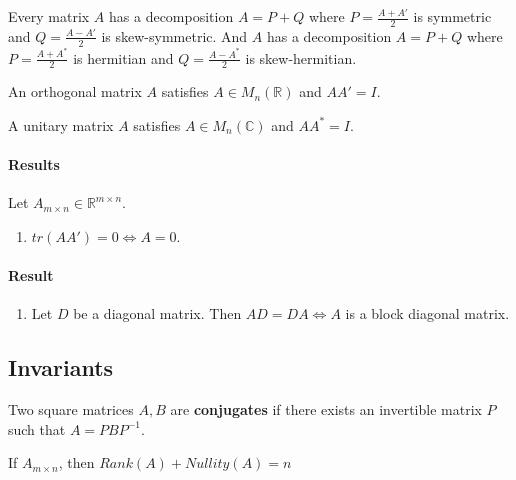 \begin{note}
	Every matrix $A$ has a decomposition $A=P+Q$ where $P = \frac{A+A'}{2}$ is symmetric and $Q = \frac{A-A'}{2}$ is skew-symmetric.
	And $A$ has a decomposition $A = P + Q$ where $P = \frac{A+A^\ast}{2}$ is hermitian and $Q = \frac{A-A^\ast}{2}$ is skew-hermitian.
\end{note}

\begin{definition}[orthogonal]
	An orthogonal matrix $A$ satisfies $A \in M_n(\mathbb{R})$ and $AA' = I$.
\end{definition}

\begin{definition}[unitary]
	A unitary matrix $A$ satisfies $A \in M_n(\mathbb{C})$ and $AA^\ast = I$.
\end{definition}

\paragraph{Results} Let $A_{m \times n} \in \mathbb{R}^{m \times n}$.
\begin{enumerate}
	\item $tr(AA') = 0 \iff A = 0$.
\end{enumerate}

\paragraph{Result}
	\begin{enumerate}
		\item Let $D$ be a diagonal matrix.
			Then $AD = DA \iff A$ is a block diagonal matrix.
	\end{enumerate}

\subsection{Invariants}
\begin{definition}[conjugation]
	Two square matrices $A,B$ are \textbf{conjugates} if there exists an invertible matrix $P$ such that $A = PBP^{-1}$.
\end{definition}

\begin{theorem}
	If $A_{m \times n}$, then $Rank(A) + Nullity(A) = n$
\end{theorem}
